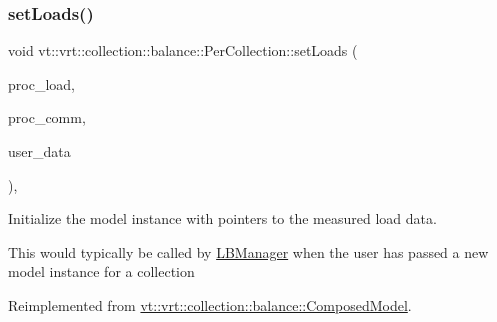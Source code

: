 \mbox{\label{structvt_1_1vrt_1_1collection_1_1balance_1_1_per_collection_a9158b31a385b34a0109cac3bc0e281a6}} 
\subsubsection{\texorpdfstring{set\+Loads()}{setLoads()}}
{\footnotesize\ttfamily void vt\+::vrt\+::collection\+::balance\+::\+Per\+Collection\+::set\+Loads (\begin{DoxyParamCaption}\item[{std\+::unordered\+\_\+map$<$ \hyperlink{namespacevt_a46ce6733d5cdbd735d561b7b4029f6d7}{Phase\+Type}, \hyperlink{namespacevt_1_1vrt_1_1collection_1_1balance_a5339303db2e1ce964d783a53fd74e6b1}{Load\+Map\+Type} $>$ const $\ast$}]{proc\+\_\+load,  }\item[{std\+::unordered\+\_\+map$<$ \hyperlink{namespacevt_a46ce6733d5cdbd735d561b7b4029f6d7}{Phase\+Type}, \hyperlink{namespacevt_1_1vrt_1_1collection_1_1balance_a01ee1fb0ae2da1d2ab7fdca3be9ae351}{Comm\+Map\+Type} $>$ const $\ast$}]{proc\+\_\+comm,  }\item[{std\+::unordered\+\_\+map$<$ \hyperlink{namespacevt_a46ce6733d5cdbd735d561b7b4029f6d7}{Phase\+Type}, \hyperlink{namespacevt_1_1vrt_1_1collection_1_1balance_acf152c668ed9e2e9c6b29784181d2435}{Data\+Map\+Type} $>$ const $\ast$}]{user\+\_\+data }\end{DoxyParamCaption})\hspace{0.3cm}{\ttfamily [override]}, {\ttfamily [virtual]}}



Initialize the model instance with pointers to the measured load data. 

This would typically be called by \hyperlink{structvt_1_1vrt_1_1collection_1_1balance_1_1_l_b_manager}{L\+B\+Manager} when the user has passed a new model instance for a collection 

Reimplemented from \hyperlink{classvt_1_1vrt_1_1collection_1_1balance_1_1_composed_model_a0c4e07b352c1e8cbb8383d26361437e5}{vt\+::vrt\+::collection\+::balance\+::\+Composed\+Model}.

\mbox{\label{structvt_1_1vrt_1_1collection_1_1balance_1_1_per_collection_a2b41fbbe2b684654f8dbfd9207b77501}} 
